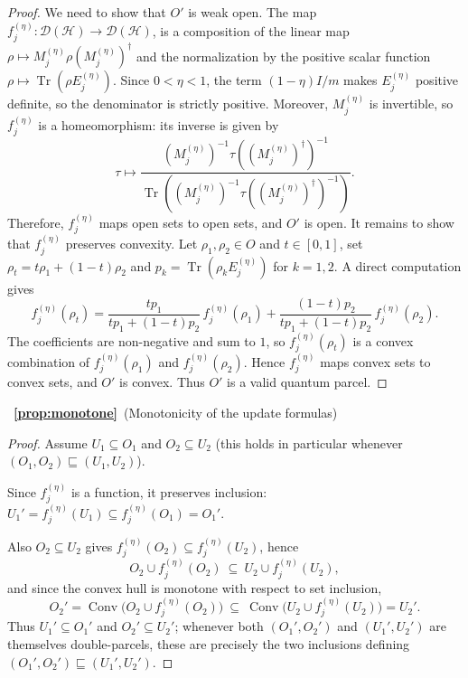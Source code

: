 \documentclass[11pt, onecolumn]{article}
\begin{document}
\begin{proof}
 We need to show that $O'$ is weak open.
The map $f_j^{(\eta)}: \mathcal{D}(\mathcal{H}) \to \mathcal{D}(\mathcal{H})$, is a composition of the linear map $\rho \mapsto M_j^{(\eta)} \rho (M_j^{(\eta)})^\dagger$ and the normalization by the positive scalar function $\rho \mapsto \operatorname{Tr}(\rho E_j^{(\eta)})$. Since $0<\eta<1$, the term $(1-\eta)I/m$ makes
$E_j^{(\eta)}$ positive definite, so the denominator is strictly positive. Moreover, $M_j^{(\eta)}$ is invertible, so $f_j^{(\eta)}$ is a homeomorphism: its inverse is given by \[\tau \mapsto
\frac{
(M_j^{(\eta)})^{-1}\tau((M_j^{(\eta)})^\dagger)^{-1}
}{
\operatorname{Tr}\!\left(
(M_j^{(\eta)})^{-1}\tau((M_j^{(\eta)})^\dagger)^{-1}
\right)
}.\] Therefore, $f_j^{(\eta)}$ maps open sets to open sets, and $O'$ is open. It remains to show that $f_j^{(\eta)}$ preserves convexity.
Let $\rho_1,\rho_2\in O$ and $t\in[0,1]$, set
$\rho_t=t\rho_1+(1-t)\rho_2$ and $p_k=\operatorname{Tr}(\rho_k E_j^{(\eta)})$
for $k=1,2$. A direct computation gives
\[
f_j^{(\eta)}(\rho_t)
=\frac{tp_1}{tp_1+(1-t)p_2}\,f_j^{(\eta)}(\rho_1)
+\frac{(1-t)p_2}{tp_1+(1-t)p_2}\,f_j^{(\eta)}(\rho_2).
\]
The coefficients are non-negative and sum to $1$, so $f_j^{(\eta)}(\rho_t)$
is a convex combination of $f_j^{(\eta)}(\rho_1)$ and $f_j^{(\eta)}(\rho_2)$.
Hence $f_j^{(\eta)}$ maps convex sets to convex sets, and $O'$ is convex.
Thus $O'$ is a valid quantum parcel.
\end{proof}

~{\bf \ref{prop:monotone}}~(Monotonicity of the update formulas)

\begin{proof}
Assume $U_1\subseteq O_1$ and $O_2\subseteq U_2$ (this holds in particular whenever $(O_1,O_2)\sqsubseteq(U_1,U_2)$).

Since $f_j^{(\eta)}$ is a function, it preserves inclusion: $U_1'=f_j^{(\eta)}(U_1)\subseteq f_j^{(\eta)}(O_1)=O_1'$.

Also $O_2\subseteq U_2$ gives $f_j^{(\eta)}(O_2)\subseteq f_j^{(\eta)}(U_2)$, hence
\[
O_2\cup f_j^{(\eta)}(O_2)\ \subseteq\ U_2\cup f_j^{(\eta)}(U_2),
\]
and since the convex hull is monotone with respect to set inclusion,
\[
O_2'=\operatorname{Conv}\bigl(O_2\cup f_j^{(\eta)}(O_2)\bigr)\ \subseteq\ \operatorname{Conv}\bigl(U_2\cup f_j^{(\eta)}(U_2)\bigr)=U_2'.
\]
Thus $U_1'\subseteq O_1'$ and $O_2'\subseteq U_2'$; whenever both $(O_1',O_2')$ and $(U_1',U_2')$ are themselves double-parcels, these are precisely the two inclusions defining $(O_1',O_2')\sqsubseteq(U_1',U_2')$.
\end{proof}
\end{document}
